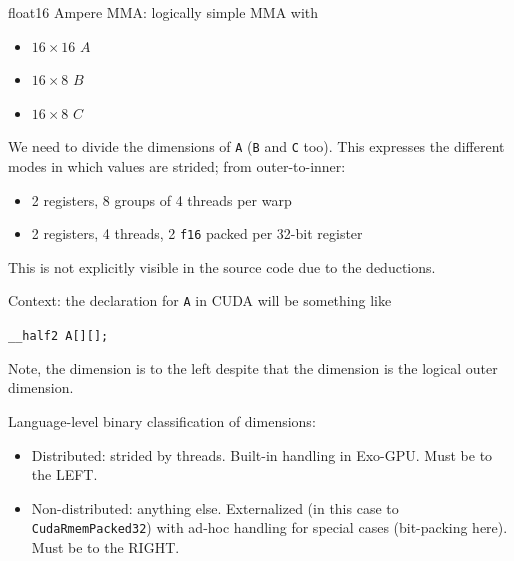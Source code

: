 \newpage
{}

{\LARGE


float16 Ampere MMA: logically simple MMA with
\begin{itemize}
  \item $16 \times 16$ $A$
  \item $16 \times 8$ $B$
  \item $16 \times 8$ $C$
\end{itemize}

}

{\large

}

\newpage
{}

{\LARGE

We need to divide the dimensions of \texttt{A} (\texttt{B} and \texttt{C} too).
This expresses the different modes in which values are strided; from outer-to-inner:
\begin{itemize}
    \item {} 2 registers, 8 groups of 4 threads per warp
    \item {} 2 registers, 4 threads, 2 \texttt{f16} packed per 32-bit register
\end{itemize}

This is not explicitly visible in the source code due to the deductions.

}

{\large

}

{\LARGE

Context: the declaration for \texttt{A} in CUDA will be something like\\

}

{\large
\texttt{\_\_half2 A[][];} 
}

\newpage
{}

{\LARGE

Note, the  dimension is to the left despite that the  dimension is the logical outer dimension.

}

{\large

}

{\LARGE

Language-level binary classification of dimensions:

\begin{itemize}
  \item Distributed: strided by threads.
    Built-in handling in Exo-GPU.
    Must be to the LEFT.
  \item Non-distributed: anything else.
    Externalized (in this case to \texttt{CudaRmemPacked32}) with ad-hoc handling for special cases (bit-packing here).
    Must be to the RIGHT.
\end{itemize}

}

